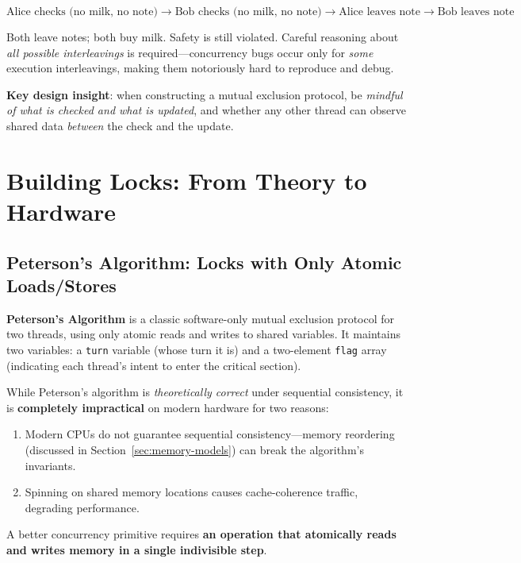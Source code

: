 \documentclass[11pt]{article}
\begin{document}
\[
\text{Alice checks (no milk, no note)} \to \text{Bob checks (no milk, no note)} \to \text{Alice leaves note} \to \text{Bob leaves note}
\]

Both leave notes; both buy milk. Safety is still violated. Careful reasoning about \emph{all possible interleavings} is required---concurrency bugs occur only for \emph{some} execution interleavings, making them notoriously hard to reproduce and debug.

\textbf{Key design insight}: when constructing a mutual exclusion protocol, be \emph{mindful of what is checked and what is updated}, and whether any other thread can observe shared data \emph{between} the check and the update.

\section{Building Locks: From Theory to Hardware}

\subsection{Peterson's Algorithm: Locks with Only Atomic Loads/Stores}

\textbf{Peterson's Algorithm} is a classic software-only mutual exclusion protocol for two threads, using only atomic reads and writes to shared variables. It maintains two variables: a \texttt{turn} variable (whose turn it is) and a two-element \texttt{flag} array (indicating each thread's intent to enter the critical section).

While Peterson's algorithm is \emph{theoretically correct} under sequential consistency, it is \textbf{completely impractical} on modern hardware for two reasons:
\begin{enumerate}
    \item Modern CPUs do not guarantee sequential consistency---memory reordering (discussed in Section~\ref{sec:memory-models}) can break the algorithm's invariants.
    \item Spinning on shared memory locations causes cache-coherence traffic, degrading performance.
\end{enumerate}

A better concurrency primitive requires \textbf{an operation that atomically reads and writes memory in a single indivisible step}.
\end{document}
